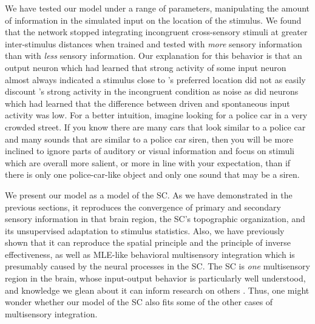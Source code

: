     We have tested our model under a range of parameters, manipulating the amount of information in the simulated input on the location of the stimulus.
    We found that the network stopped integrating incongruent cross-sensory stimuli at greater inter-stimulus distances when trained and tested with \emph{more} sensory information than with \emph{less} sensory information.
    Our explanation for this behavior is that an output neuron  which had learned that strong activity of some input neuron  almost always indicated a stimulus close to 's preferred location did not as easily discount 's strong activity in the incongruent condition as noise as did neurons which had learned that the difference between driven and spontaneous input activity was low.
    For a better intuition, imagine looking for a police car in a very crowded street.
    If you know there are many cars that look similar to a police car and many sounds that are similar to a police car siren, then you will be more inclined to ignore parts of auditory or visual information and focus on stimuli which are overall more salient, or more in line with your expectation, than if there is only one police-car-like object and only one sound that may be a siren.

    We present our model as a model of the \ac{SC}.
    As we have demonstrated in the previous sections, it reproduces the convergence of primary and secondary sensory information in that brain region, the \ac{SC}'s topographic organization, and its unsupervised adaptation to stimulus statistics.
    Also, we have previously~\citep{bauer-et-al-2014} shown that it can reproduce the spatial principle and the principle of inverse effectiveness, as well as \ac{MLE}-like behavioral multisensory integration which is presumably caused by the neural processes in the \ac{SC}.
    The \ac{SC} is \emph{one} multisensory region in the brain, whose input-output behavior is particularly well understood, and knowledge we glean about it can inform research on others \citep{stein-2012}.
    Thus, one might wonder whether our model of the \ac{SC} also fits some of the other cases of multisensory integration.

